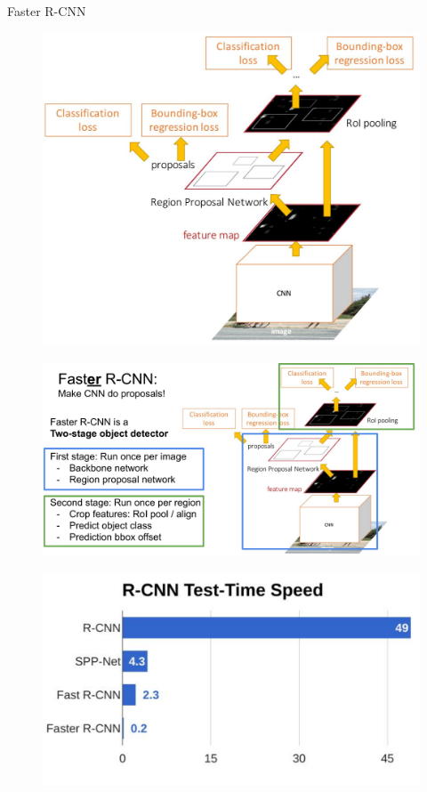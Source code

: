 \begin{frame}[allowframebreaks]{Faster R-CNN}

\begin{figure}
\centering
\includegraphics[width=1.0\textwidth,height=0.9\textheight,keepaspectratio]{images/obj-det/faster_rcnn_1.png}
\end{figure}

\framebreak

\begin{figure}
\centering
\includegraphics[width=1.0\textwidth,height=1.0\textheight,keepaspectratio]{images/obj-det/faster_rcnn_2.png}
\end{figure}

\framebreak

\begin{figure}
\centering
\includegraphics[width=1.0\textwidth,height=1.0\textheight,keepaspectratio]{images/obj-det/faster_rcnn_3.png}
\end{figure}
\end{frame}
